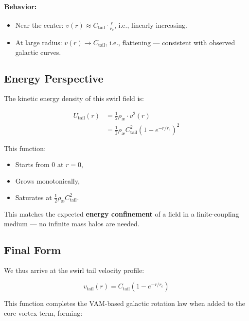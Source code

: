 \documentclass[12pt]{article}
\begin{document}
\paragraph{Behavior:}
\begin{itemize}
    \item Near the center: \( v(r) \approx C_{\text{tail}} \cdot \frac{r}{r_c} \), i.e., linearly increasing.
    \item At large radius: \( v(r) \to C_{\text{tail}} \), i.e., flattening — consistent with observed galactic curves.
\end{itemize}

\subsection{Energy Perspective}

The kinetic energy density of this swirl field is:

\begin{align}
    U_\text{tail}(r)
    &= \frac{1}{2} \rho_{\text{\ae}} \cdot v^2(r) \\
    &= \frac{1}{2} \rho_{\text{\ae}} C_{\text{tail}}^2 \left( 1 - e^{-r/r_c} \right)^2
    \label{eq:tail_energy_density}
\end{align}

This function:
\begin{itemize}
    \item Starts from 0 at \( r=0 \),
    \item Grows monotonically,
    \item Saturates at \( \frac{1}{2} \rho_{\text{\ae}} C_{\text{tail}}^2 \).
\end{itemize}

This matches the expected \textbf{energy confinement} of a field in a finite-coupling medium — no infinite mass halos are needed.

\subsection{Final Form}

We thus arrive at the swirl tail velocity profile:

\begin{equation}
    \boxed{
    v_\text{tail}(r) = C_{\text{tail}} \left(1 - e^{-r/r_c} \right)
    }
\end{equation}

This function completes the VAM-based galactic rotation law when added to the core vortex term, forming:
\end{document}
